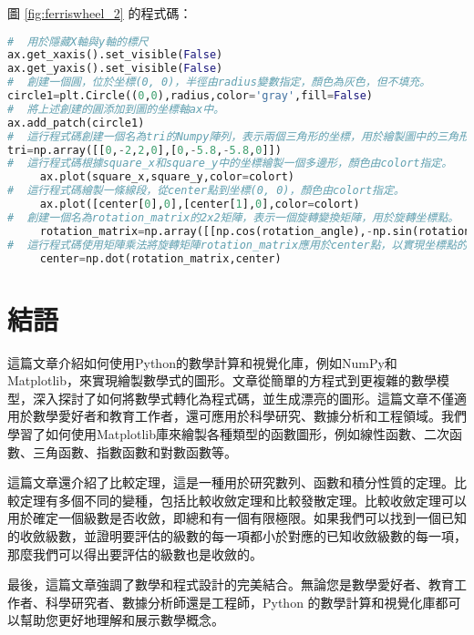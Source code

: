 圖 \ref{fig:ferriswheel_2} 的程式碼：
\begin{lstlisting}[language=Python]
#  用於隱藏X軸與y軸的標尺
ax.get_xaxis().set_visible(False)
ax.get_yaxis().set_visible(False)
#  創建一個圓，位於坐標(0, 0)，半徑由radius變數指定，顏色為灰色，但不填充。
circle1=plt.Circle((0,0),radius,color='gray',fill=False)
#  將上述創建的圓添加到圖的坐標軸ax中。
ax.add_patch(circle1)
#  這行程式碼創建一個名為tri的Numpy陣列，表示兩個三角形的坐標，用於繪製圖中的三角形。
tri=np.array([[0,-2,2,0],[0,-5.8,-5.8,0]])
#  這行程式碼根據square_x和square_y中的坐標繪製一個多邊形，顏色由colort指定。
     ax.plot(square_x,square_y,color=colort)
#  這行程式碼繪製一條線段，從center點到坐標(0, 0)，顏色由colort指定。
     ax.plot([center[0],0],[center[1],0],color=colort)
#  創建一個名為rotation_matrix的2x2矩陣，表示一個旋轉變換矩陣，用於旋轉坐標點。
     rotation_matrix=np.array([[np.cos(rotation_angle),-np.sin(rotation_angle)],[np.sin(rotation_angle),np.cos(rotation_angle)]])
#  這行程式碼使用矩陣乘法將旋轉矩陣rotation_matrix應用於center點，以實現坐標點的旋轉。center點現在將成為旋轉後的新坐標。
     center=np.dot(rotation_matrix,center)
\end{lstlisting}
\section{結語}
這篇文章介紹如何使用Python的數學計算和視覺化庫，例如NumPy和Matplotlib，來實現繪製數學式的圖形。文章從簡單的方程式到更複雜的數學模型，深入探討了如何將數學式轉化為程式碼，並生成漂亮的圖形。這篇文章不僅適用於數學愛好者和教育工作者，還可應用於科學研究、數據分析和工程領域。我們學習了如何使用Matplotlib庫來繪製各種類型的函數圖形，例如線性函數、二次函數、三角函數、指數函數和對數函數等。

這篇文章還介紹了比較定理，這是一種用於研究數列、函數和積分性質的定理。比較定理有多個不同的變種，包括比較收斂定理和比較發散定理。比較收斂定理可以用於確定一個級數是否收斂，即總和有一個有限極限。如果我們可以找到一個已知的收斂級數，並證明要評估的級數的每一項都小於對應的已知收斂級數的每一項，那麼我們可以得出要評估的級數也是收斂的。

最後，這篇文章強調了數學和程式設計的完美結合。無論您是數學愛好者、教育工作者、科學研究者、數據分析師還是工程師，Python 的數學計算和視覺化庫都可以幫助您更好地理解和展示數學概念。






















